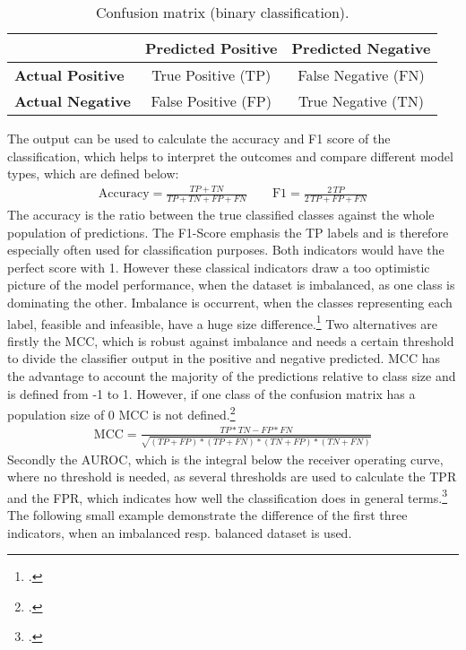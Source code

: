\begin{table}[ht]
    \centering
    \begin{tabular}{@{}lcc@{}}
        \toprule
                                 & \textbf{Predicted Positive} & \textbf{Predicted Negative} \\
        \midrule
        \textbf{Actual Positive} & True Positive (TP)          & False Negative (FN)         \\
        \textbf{Actual Negative} & False Positive (FP)         & True Negative (TN)          \\
        \bottomrule
    \end{tabular}
    \caption{Confusion matrix (binary classification).}
    \label{tab:confusion_matrix}
\end{table}
The output can be used to calculate the accuracy and F1 score of the classification, which
helps to interpret the outcomes and compare different model types, which are defined below:
\begin{align}
    \text{Accuracy}=\frac{TP+TN}{TP+TN+FP+FN}
    \qquad
    \text{F1}=\frac{2\,TP}{2\,TP+FP+FN}
\end{align}
The accuracy is the ratio between the true classified classes against the whole population
of predictions. The F1-Score emphasis the TP labels and is therefore especially
often used for classification purposes. Both indicators would have the perfect score with 1.
However these classical indicators draw a too optimistic picture of the model performance,
when the dataset is imbalanced, as one class is dominating the other. Imbalance is occurrent,
when the classes representing each label, feasible and infeasible, have a huge size difference.\footcite[cf.][p. 2f.]{chicco_advantages_2020}
Two alternatives are firstly the \gls{MCC}, which is robust against imbalance
and needs a certain threshold to divide the classifier output in the positive
and negative predicted. \gls{MCC} has the advantage to account the majority of the predictions
relative to class size and is defined from -1 to 1. However, if one class of the confusion
matrix has a population size of 0 \gls{MCC} is not defined.\footcite[cf.][p.5]{chicco_advantages_2020}
\begin{align}
    \text{MCC}=\frac{TP*TN - FP*FN}{\sqrt{(TP+FP)*(TP+FN)*(TN+FP)*(TN+FN)}}
\end{align}
Secondly the \gls{AUROC}, which is the integral below the
receiver operating curve, where no threshold is needed, as several thresholds are used
to calculate the \gls{TPR} and the \gls{FPR},
which indicates how well the classification does in general terms.\footcite[cf.][p.2f.]{chicco_advantages_2020}
The following small example demonstrate the difference of the first three indicators, when
an imbalanced resp. balanced dataset is used.

